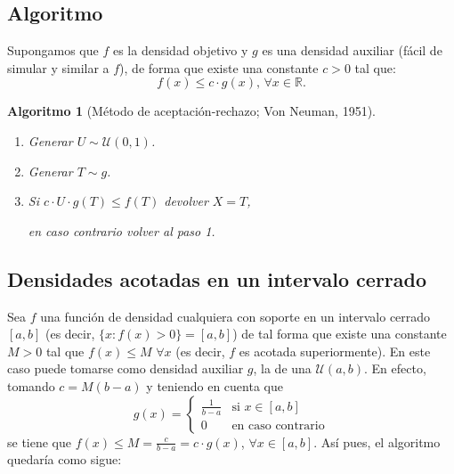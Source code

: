 \documentclass[
]{book}
\theoremstyle{break}
\newtheorem{conjecture}{Algoritmo}[chapter]
\theoremstyle{definition}
\theoremstyle{definition}
\theoremstyle{definition}
\theoremstyle{definition}
\theoremstyle{remark}
\begin{document}
\hypertarget{algoritmo}{%
\subsection{Algoritmo}\label{algoritmo}}

Supongamos que \(f\) es la densidad objetivo y \(g\) es una densidad
auxiliar (fácil de simular y similar a \(f\)), de forma que
existe una constante \(c>0\) tal que:
\[f(x) \leq c\cdot g(x) 
\text{, }\forall x\in \mathbb{R}\text{.}\]

\begin{conjecture}[Método de aceptación-rechazo; Von Neuman, 1951]
\protect\hypertarget{cnj:aceptacion-rechazo}{}{\label{cnj:aceptacion-rechazo} {} }

\begin{enumerate}
\def\labelenumi{\arabic{enumi}.}
\item
  Generar \(U \sim \mathcal{U}(0, 1)\).
\item
  Generar \(T\sim g\).
\item
  Si \(c\cdot U\cdot g\left( T\right) \leq f\left( T\right)\)
  devolver \(X=T\),

  en caso contrario volver al paso 1.
\end{enumerate}
\end{conjecture}

\hypertarget{densidades-acotadas-en-un-intervalo-cerrado}{%
\subsection{Densidades acotadas en un intervalo cerrado}\label{densidades-acotadas-en-un-intervalo-cerrado}}

Sea \(f\) una función de densidad cualquiera con soporte en un intervalo cerrado \([a,b]\) (es decir, \(\{x : f(x) > 0\}=[a,b]\)) de tal forma que existe una constante \(M>0\) tal que \(f(x) \leq M\) \(\forall x\) (es decir, \(f\) es acotada superiormente).
En este caso puede tomarse como densidad auxiliar \(g\), la de una \(\mathcal{U}(a,b)\).
En efecto, tomando \(c = M\left( b-a\right)\) y teniendo en cuenta que
\[g(x) = \left\{
\begin{array}{ll}\frac{1}{b-a} & \text{si } x \in [a,b]\\
0 & \text{en caso contrario}
\end{array} \right.\]
se tiene que \(f(x) \leq M = \frac{c}{b-a}=c \cdot g(x)\),
\(\forall x \in [a,b]\).
Así pues, el algoritmo quedaría como sigue:
\end{document}
